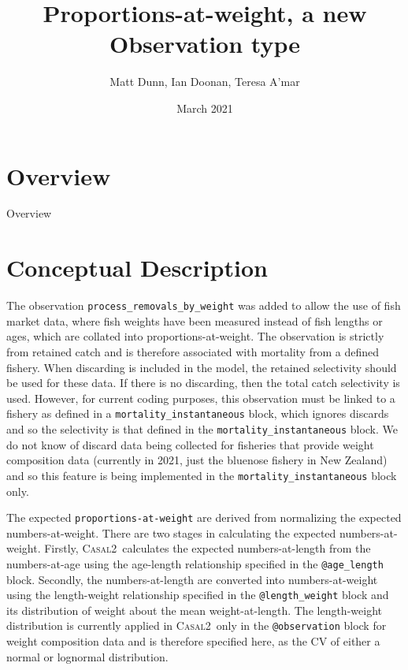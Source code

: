 \documentclass[a4paper,11pt,twoside,pdftex,draft]{article}
\title{Proportions-at-weight, a new Observation type}
\author{Matt Dunn, Ian Doonan, Teresa A'mar}
\date{March 2021}
\newcommand{\CNAME}{\textsc{Casal2}}
\begin{document}
\maketitle

\pagestyle{plain}
\setcounter{page}{1}


\newpage

\section{Overview}

Overview

\section{Conceptual Description}

The observation \texttt{process\_removals\_by\_weight} was added to allow the use of fish market data, where fish weights have been measured instead of fish lengths or ages, which are collated into proportions-at-weight. The observation is strictly from retained catch and is therefore associated with mortality from a defined fishery. When discarding is included in the model, the retained selectivity should be used for these data. If there is no discarding, then the total catch selectivity is used. However, for current coding purposes, this observation must be linked to a fishery as defined in a \texttt{mortality\_instantaneous} block, which ignores discards and so the selectivity is that defined in the \texttt{mortality\_instantaneous} block. We do not know of discard data being collected for fisheries that provide weight composition data (currently in 2021, just the bluenose fishery in New Zealand) and so this feature is being implemented in the \texttt{mortality\_instantaneous} block only.

The expected  \texttt{proportions-at-weight} are derived from normalizing the expected numbers-at-weight. There are two stages in calculating the expected numbers-at-weight. Firstly, \CNAME~calculates the expected numbers-at-length from the numbers-at-age using the age-length relationship specified in the \texttt{@age\_length} block. Secondly, the numbers-at-length are converted into numbers-at-weight using the length-weight relationship specified in the \texttt{@length\_weight} block and its distribution of weight about the mean weight-at-length. The length-weight distribution is currently applied in \CNAME~only in the \texttt{@observation} block for weight composition data and is therefore specified here, as the CV of either a normal or lognormal distribution.
\end{document}
